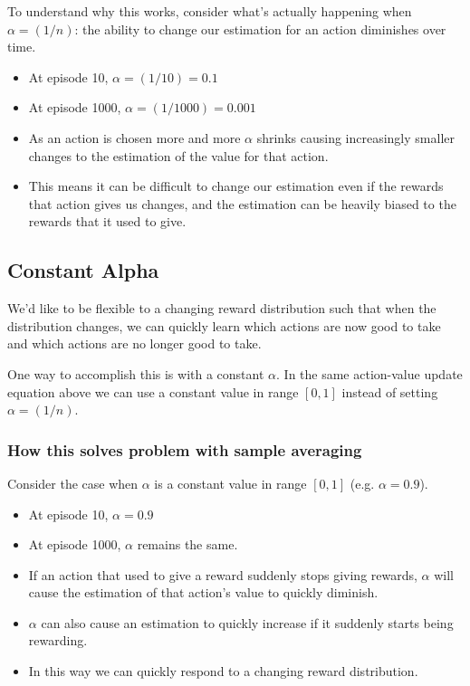 To understand why this works, consider what’s actually happening when $\alpha = (1/n)$: the ability to change our estimation for an action diminishes over time.

\begin{itemize}
    \item At episode 10, $\alpha = (1/10) = 0.1$
    \item At episode 1000, $\alpha = (1/1000) = 0.001$
    \item As an action is chosen more and more $\alpha$ shrinks causing increasingly smaller changes to the estimation of the value for that action.
    \item This means it can be difficult to change our estimation even if the rewards that action gives us changes, and the estimation can be heavily biased to the rewards that it used to give.
\end{itemize}

\subsection{Constant Alpha \cite{medium-numsmt2-rl-ch2-part-3}}\label{MAB: Constant Alpha}

We’d like to be flexible to a changing reward distribution such that when the distribution changes, we can quickly learn which actions are now good to take and which actions are no longer good to take.

One way to accomplish this is with a constant $\alpha$. In the same action-value update equation above we can use a constant value in range $[0, 1]$ instead of setting $\alpha = (1/n)$.

\subsubsection{How this solves problem with sample averaging}
Consider the case when $\alpha$ is a constant value in range $[0, 1]$ (e.g. $\alpha = 0.9$).
\begin{itemize}
    \item At episode 10, $\alpha = 0.9$
    \item At episode 1000, $\alpha$ remains the same.
    \item If an action that used to give a reward suddenly stops giving rewards, $\alpha$ will cause the estimation of that action’s value to quickly diminish.
    \item $\alpha$ can also cause an estimation to quickly increase if it suddenly starts being rewarding.
    \item In this way we can quickly respond to a changing reward distribution.
\end{itemize}

